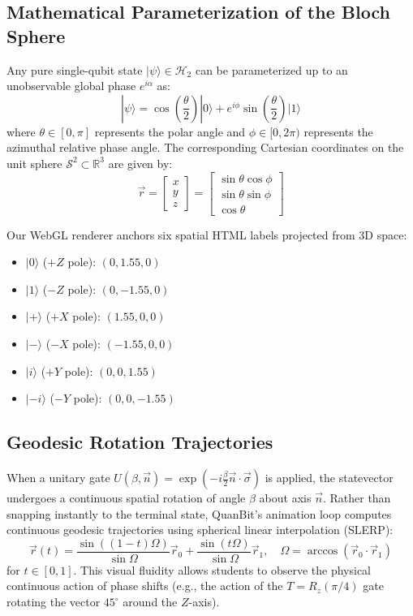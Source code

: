 \documentclass[conference]{IEEEtran}
\begin{document}
\subsection{Mathematical Parameterization of the Bloch Sphere}
Any pure single-qubit state $|\psi\rangle \in \mathcal{H}_2$ can be parameterized up to an unobservable global phase $e^{i\alpha}$ as:
\begin{equation}
|\psi\rangle = \cos\left(\frac{\theta}{2}\right)|0\rangle + e^{i\phi}\sin\left(\frac{\theta}{2}\right)|1\rangle
\end{equation}
where $\theta \in [0, \pi]$ represents the polar angle and $\phi \in [0, 2\pi)$ represents the azimuthal relative phase angle. The corresponding Cartesian coordinates on the unit sphere $\mathcal{S}^2 \subset \mathbb{R}^3$ are given by:
\begin{equation}
\vec{r} = \begin{bmatrix} x \\ y \\ z \end{bmatrix} = \begin{bmatrix} \sin\theta\cos\phi \\ \sin\theta\sin\phi \\ \cos\theta \end{bmatrix}
\end{equation}

Our WebGL renderer anchors six spatial HTML labels projected from 3D space:
\begin{itemize}[leftmargin=*,itemsep=2pt]
    \item $|0\rangle$ ($+Z$ pole): $(0, 1.55, 0)$
    \item $|1\rangle$ ($-Z$ pole): $(0, -1.55, 0)$
    \item $|+\rangle$ ($+X$ pole): $(1.55, 0, 0)$
    \item $|-\rangle$ ($-X$ pole): $(-1.55, 0, 0)$
    \item $|i\rangle$ ($+Y$ pole): $(0, 0, 1.55)$
    \item $|-i\rangle$ ($-Y$ pole): $(0, 0, -1.55)$
\end{itemize}

\subsection{Geodesic Rotation Trajectories}
When a unitary gate $U(\beta, \vec{n}) = \exp(-i \frac{\beta}{2} \vec{n} \cdot \vec{\sigma})$ is applied, the statevector undergoes a continuous spatial rotation of angle $\beta$ about axis $\vec{n}$. Rather than snapping instantly to the terminal state, QuanBit's animation loop computes continuous geodesic trajectories using spherical linear interpolation (SLERP):
\begin{equation}
\vec{r}(t) = \frac{\sin((1-t)\Omega)}{\sin\Omega}\vec{r}_0 + \frac{\sin(t\Omega)}{\sin\Omega}\vec{r}_1, \quad \Omega = \arccos(\vec{r}_0 \cdot \vec{r}_1)
\end{equation}
for $t \in [0, 1]$. This visual fluidity allows students to observe the physical continuous action of phase shifts (e.g., the action of the $T = R_z(\pi/4)$ gate rotating the vector $45^\circ$ around the $Z$-axis).
\end{document}
